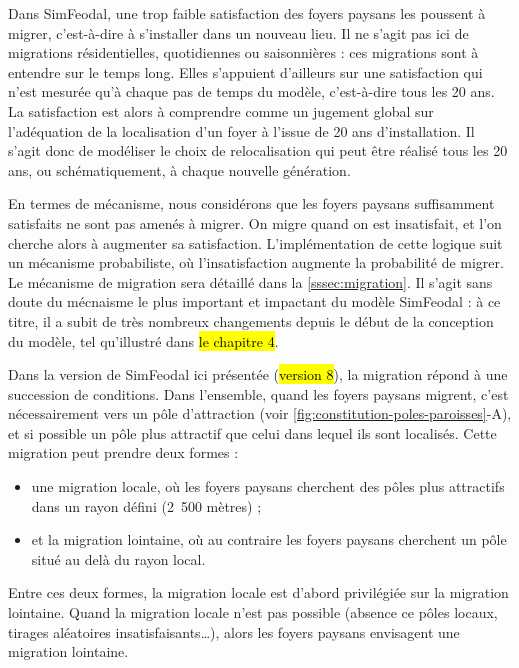 \begin{tcolorbox}[breakable,left=0pt,right=0pt,top=0pt,bottom=0pt,
	colback=gray!15,colframe=gray!15,width=\dimexpr\textwidth\relax, 
	enlarge left by=0mm, boxsep=5pt,arc=0pt,outer arc=0pt]
Dans SimFeodal, une trop faible satisfaction des foyers paysans les poussent à migrer, c'est-à-dire à s'installer dans un nouveau lieu.
Il ne s'agit pas ici de migrations résidentielles, quotidiennes ou saisonnières : ces migrations sont à entendre sur le temps long.
Elles s'appuient d'ailleurs sur une satisfaction qui n'est mesurée qu'à chaque pas de temps du modèle, c'est-à-dire tous les 20 ans.
La satisfaction est alors à comprendre comme un jugement global sur l'adéquation de la localisation d'un foyer à l'issue de 20 ans d'installation.
Il s'agit donc de modéliser le choix de relocalisation qui peut être réalisé tous les 20 ans, ou schématiquement, à chaque nouvelle génération.

En termes de mécanisme, nous considérons que les foyers paysans suffisamment satisfaits ne sont pas amenés à migrer.
On migre quand on est insatisfait, et l'on cherche alors à augmenter sa satisfaction.
L'implémentation de cette logique suit un mécanisme probabiliste, où l'insatisfaction augmente la probabilité de migrer.
Le mécanisme de migration sera détaillé dans la \cref{sssec:migration}.
Il s'agit sans doute du mécnaisme le plus important et impactant du modèle SimFeodal : à ce titre, il a subit de très nombreux changements depuis le début de la conception du modèle, tel qu'illustré dans \hl{le chapitre 4}.

Dans la version de SimFeodal ici présentée (\hl{version 8}), la migration répond à une succession de conditions.
Dans l'ensemble, quand les foyers paysans migrent, c'est nécessairement vers un pôle d'attraction (voir \cref{fig:constitution-poles-paroisses}-A), et si possible un pôle plus attractif que celui dans lequel ils sont localisés.
Cette migration peut prendre deux formes :
\begin{itemize}
	\item une migration \og locale\fg{}, où les foyers paysans cherchent des pôles plus attractifs dans un rayon défini (2~500 mètres) ;
	\item et la migration \og lointaine\fg{}, où au contraire les foyers paysans cherchent un pôle situé au delà du rayon local.
\end{itemize} 

Entre ces deux formes, la migration locale est d'abord privilégiée sur la migration lointaine\footnotemark.
Quand la migration locale n'est pas possible (absence ce pôles locaux, tirages aléatoires insatisfaisants\ldots), alors les foyers paysans envisagent une migration lointaine.
\end{tcolorbox}

